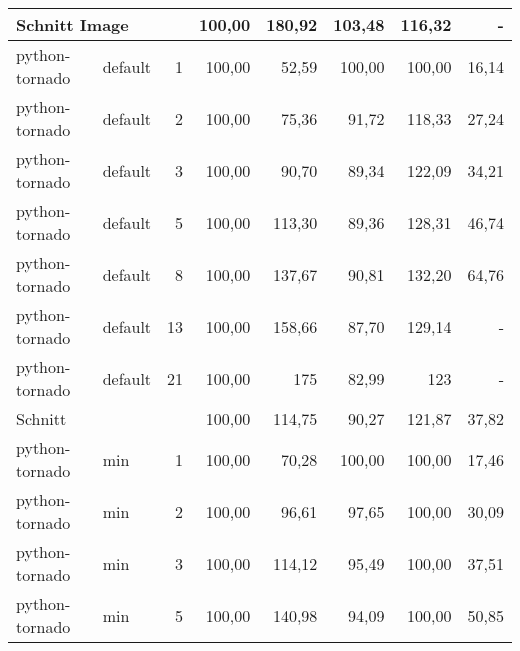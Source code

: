 \begin{footnotesize}
\begin{longtable}{llrrrrrr}
		\multicolumn{2}{l}{Schnitt Image} &            & 100,00 & 180,92                      & 103,48                      & 116,32                      & -                           \\ \hline
		python-tornado & default & 1          & 100,00 & 52,59                       & \cellcolor[HTML]{C0C0C0}100,00 & \cellcolor[HTML]{C0C0C0}100,00 & 16,14                       \\
		python-tornado & default & 2          & 100,00 & 75,36                       & 91,72                       & 118,33                      & 27,24                       \\
		python-tornado & default & 3          & 100,00 & 90,70                       & 89,34                       & 122,09                      & 34,21                       \\
		python-tornado & default & 5          & 100,00 & 113,30                      & 89,36                       & 128,31                      & 46,74                       \\
		python-tornado & default & 8          & 100,00 & 137,67                      & 90,81                       & 132,20                      & 64,76                       \\
		python-tornado & default & 13         & 100,00 & 158,66                      & 87,70                       & 129,14                      & -                           \\
		python-tornado & default & 21         & 100,00 & 175                         & 82,99                       & 123                         & -                           \\ \hline
		Schnitt        &         &            & 100,00 & 114,75                      & 90,27                       & 121,87                      & 37,82                       \\ \hline
		python-tornado & min     & 1          & 100,00 & 70,28                       & \cellcolor[HTML]{C0C0C0}100,00 & \cellcolor[HTML]{C0C0C0}100,00 & 17,46                       \\
		python-tornado & min     & 2          & 100,00 & 96,61                       & 97,65                       & \cellcolor[HTML]{C0C0C0}100,00 & 30,09                       \\
		python-tornado & min     & 3          & 100,00 & 114,12                      & 95,49                       & \cellcolor[HTML]{C0C0C0}100,00 & 37,51                       \\
		python-tornado & min     & 5          & 100,00 & 140,98                      & 94,09                       & \cellcolor[HTML]{C0C0C0}100,00 & 50,85                       \\

\end{longtable}
\end{footnotesize}
